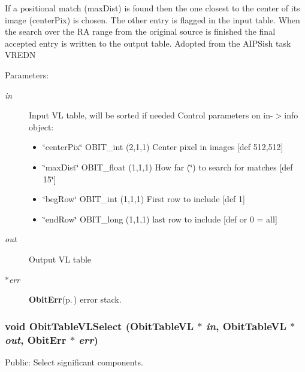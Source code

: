 If a positional match (max\-Dist) is found then the one closest to the center of its image (center\-Pix) is chosen. The other entry is flagged in the input table. When the search over the RA range from the original source is finished the final accepted entry is written to the output table. Adopted from the AIPSish task VREDN \begin{Desc}
\item[Parameters:]
\begin{description}
\item[{\em in}]Input VL table, will be sorted if needed Control parameters on in-$>$info object: \begin{itemize}
\item \char`\"{}center\-Pix\char`\"{} OBIT\_\-int (2,1,1) Center pixel in images [def 512,512] \item \char`\"{}max\-Dist\char`\"{} OBIT\_\-float (1,1,1) How far (\char`\"{}) to search for matches [def 15\char`\"{}] \item \char`\"{}beg\-Row\char`\"{} OBIT\_\-int (1,1,1) First row to include [def 1] \item \char`\"{}end\-Row\char`\"{} OBIT\_\-long (1,1,1) last row to include [def or 0 = all] \end{itemize}
\item[{\em out}]Output VL table \item[{\em $\ast$err}]{\bf Obit\-Err}{\rm (p.\,\pageref{structObitErr})} error stack. \end{description}
\end{Desc}
\subsubsection{\setlength{\rightskip}{0pt plus 5cm}void Obit\-Table\-VLSelect ({\bf Obit\-Table\-VL} $\ast$ {\em in}, {\bf Obit\-Table\-VL} $\ast$ {\em out}, {\bf Obit\-Err} $\ast$ {\em err})}\label{ObitTableVLUtil_8h_a3}


Public: Select significant components. 

